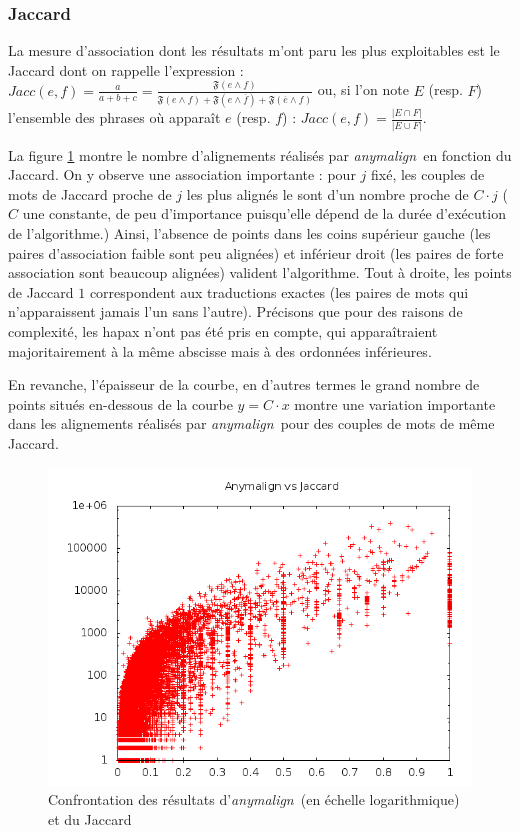 \documentclass[a4paper,10pt]{article}
\newcommand{\anym}{\emph{anymalign}}
\begin{document}
\subsubsection{Jaccard}

La mesure d'association dont les résultats m'ont paru les plus exploitables
est le Jaccard dont on rappelle l'expression : $Jacc(e,f)=\frac{a}{a+b+c}=\frac{\mathfrak{F}(e\wedge f)}{\mathfrak{F}(e\wedge f)+\mathfrak{F}(e\wedge\overline{f})+\mathfrak{F}(\overline{e}\wedge f)}$ ou, si l'on note $E$ (resp. $F$) l'ensemble des phrases où apparaît $e$ (resp. $f$) : $Jacc(e,f)=\frac{|E\cap F|}{|E\cup F|}$.

La figure \ref{jaccard} montre le nombre d'alignements réalisés par \anym~en fonction du Jaccard. On y observe une association importante : 
pour $j$ fixé, les couples de mots de Jaccard proche de $j$ les plus alignés le sont d'un nombre proche de $C\cdot j$ ($C$ une constante, de peu d'importance puisqu'elle dépend de la durée d'exécution de l'algorithme.) Ainsi, l'absence de points dans les coins supérieur gauche (les paires d'association faible sont peu alignées) et inférieur droit (les paires de forte association sont beaucoup alignées) valident l'algorithme. Tout à droite, les points de Jaccard $1$ correspondent aux traductions exactes (les paires de mots qui n'apparaissent jamais l'un sans l'autre). Précisons que pour des raisons de complexité, les hapax n'ont pas été pris en compte, qui apparaîtraient majoritairement à la même abscisse mais à des ordonnées inférieures.

En revanche, l'épaisseur de la courbe, en d'autres termes le grand nombre de points situés en-dessous de la courbe $y = C\cdot x$ montre une variation importante dans les alignements réalisés par \anym~pour des couples de mots de même Jaccard.

\begin{figure}[t]
\centering
\includegraphics[width=12cm]{jacclog.png}
\caption{Confrontation des résultats d'\anym~(en échelle logarithmique) et du Jaccard}
\label{jaccard}
\end{figure}
\end{document}
